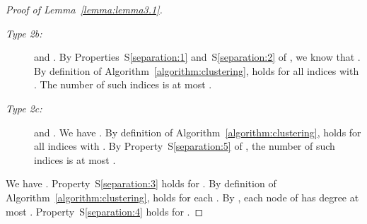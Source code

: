 \documentclass[12pt]{article}
\begin{document}
\begin{proof}[Proof of Lemma~\ref{lemma:lemma3.1}]
\begin{description}
\begin{description}
\item[\rm\em Type 2b:]  and
.  By
  Properties~S\ref{separation:1} and~S\ref{separation:2} of
  , we know that . By definition
  of Algorithm~\ref{algorithm:clustering},
   holds for all indices 
  with .  The number of such indices  is at
  most .

\item[\rm\em Type 2c:]  and . We have .  By definition of
  Algorithm~\ref{algorithm:clustering},
   holds for all indices 
  with .  By Property~S\ref{separation:5} of
  , the number of such indices  is at most
  .
\end{description}
\end{description}
We have .  Property~S\ref{separation:3} holds
for .  By definition of Algorithm~\ref{algorithm:clustering},
 holds for each .  By , each node of  has degree at most
. Property~S\ref{separation:4} holds for .


\end{proof}
\end{document}
